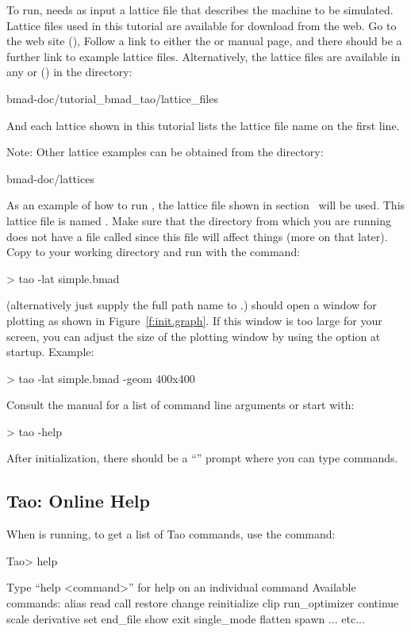 \documentclass{hitec}     %
\begin{document}
To run, \tao needs as input a \bmad lattice file that describes the machine to be simulated.
Lattice files used in this tutorial are available for download from the web. Go to the \bmad web
site (), Follow a link to either the \bmad or \tao manual page, and there should
be a further link to example lattice files. Alternatively, the lattice files are available in any
 or  () in the directory:
\begin{code}
bmad-doc/tutorial_bmad_tao/lattice_files
\end{code}
And each lattice shown in this tutorial lists the lattice file name on the first line.

Note: Other lattice examples can be obtained from the directory:
\begin{code}
bmad-doc/lattices
\end{code}

As an example of how to run \tao, the lattice file shown in section~ will be
used. This lattice file is named .  Make sure that the directory from which you are
running \tao does not have a file called  since this file will affect things (more on
that later). Copy  to your working directory and run \tao with the command:
\begin{code}
> tao -lat simple.bmad
\end{code}
(alternatively just supply the full path name to .)  \tao should open a window for
plotting as shown in Figure~\ref{f:init.graph}. If this window is too large for your screen, you can
adjust the size of the plotting window by using the  option at startup. Example:
\begin{code}
> tao -lat simple.bmad -geom 400x400
\end{code}
Consult the \tao manual for a list of command line arguments or start \tao with:
\begin{code}
> tao -help
\end{code}

After initialization, there should be a ``'' prompt where you can type \tao commands.

\subsection{Tao: Online Help}

When \tao is running, to get a list of Tao commands, use the  command:
\begin{code}
Tao> help

Type ``help <command>'' for help on an individual command
Available commands:
  alias                             read
  call                              restore
  change                            reinitialize
  clip                              run_optimizer
  continue                          scale
  derivative                        set
  end_file                          show
  exit                              single_mode
  flatten                           spawn
... etc...
\end{code}
\end{document}
